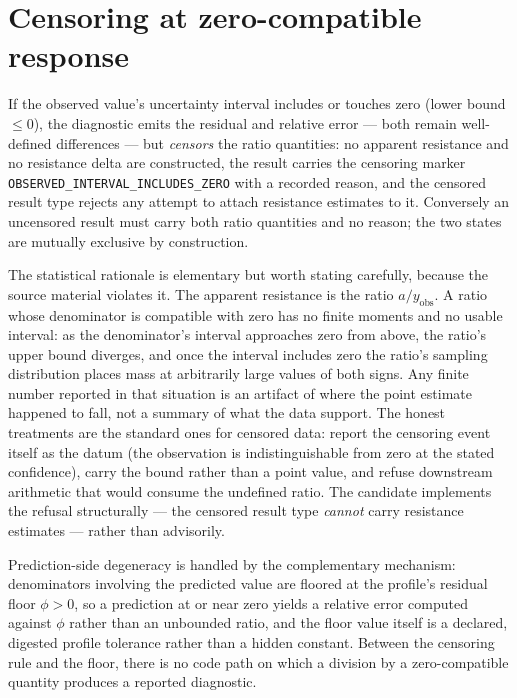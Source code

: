 \section{Censoring at zero-compatible response}\label{ch10:sec:censoring}

\begin{definition}\label{ch10:def:censoring}
If the observed value's uncertainty interval includes or touches zero
(lower bound $\le 0$), the diagnostic emits the residual and relative
error --- both remain well-defined differences --- but \emph{censors} the
ratio quantities: no apparent resistance and no resistance delta are
constructed, the result carries the censoring marker
\texttt{OBSERVED\_INTERVAL\_INCLUDES\_ZERO} with a recorded reason, and
the censored result type rejects any attempt to attach resistance
estimates to it. Conversely an uncensored result must carry both ratio
quantities and no reason; the two states are mutually exclusive by
construction.
\end{definition}

The statistical rationale is elementary but worth stating carefully,
because the source material violates it. The apparent resistance is the
ratio $a / y_{\mathrm{obs}}$. A ratio whose denominator is compatible
with zero has no finite moments and no usable interval: as the
denominator's interval approaches zero from above, the ratio's upper
bound diverges, and once the interval includes zero the ratio's sampling
distribution places mass at arbitrarily large values of both signs. Any
finite number reported in that situation is an artifact of where the
point estimate happened to fall, not a summary of what the data support.
The honest treatments are the standard ones for censored data: report
the censoring event itself as the datum (the observation is
indistinguishable from zero at the stated confidence), carry the bound
rather than a point value, and refuse downstream arithmetic that would
consume the undefined ratio. The candidate implements the refusal
structurally --- the censored result type \emph{cannot} carry resistance
estimates --- rather than advisorily.

Prediction-side degeneracy is handled by the complementary mechanism:
denominators involving the predicted value are floored at the profile's
residual floor $\phi > 0$, so a prediction at or near zero yields a
relative error computed against $\phi$ rather than an unbounded ratio,
and the floor value itself is a declared, digested profile tolerance
rather than a hidden constant. Between the censoring rule and the floor,
there is no code path on which a division by a zero-compatible quantity
produces a reported diagnostic.

